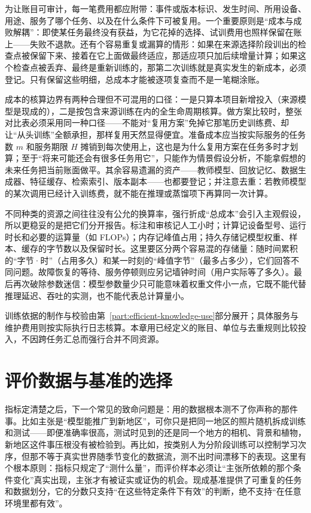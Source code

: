 为让账目可审计，每一笔费用都应附带：事件或版本标识、发生时间、所用设备、用途、服务了哪个任务、以及在什么条件下可被复用。一个重要原则是“成本与成败解耦”：即使某任务最终没有获益，为它花掉的选择、试训费用也照样保留在账上——失败不退款。还有个容易重复或漏算的情形：如果在来源选择阶段训出的检查点被保留下来、接着在它上面做最终适应，那适应项只加后续增量计算；如果这个检查点被丢弃、最终是重新训练的，那第二次训练就是真实发生的新成本，必须登记。只有保留这些明细，总成本才能被逐项复查而不是一笔糊涂账。

成本的核算边界有两种合理但不可混用的口径：一是只算本项目新增投入（来源模型是现成的），二是按包含来源训练在内的全生命周期核算。做方案比较时，整张对比表必须采用同一种口径——不能对“复用方案”免掉它那笔历史训练费、却让“从头训练”全额承担，那样复用天然显得便宜。准备成本应当按实际服务的任务数 $m$ 和服务期限 $H$ 摊销到每次使用上，这也是为什么复用方案在任务多时才划算；至于“将来可能还会有很多任务用它”，只能作为情景假设分析，不能拿假想的未来任务把当前账面做平。其余容易遗漏的资产——教师模型、回放记忆、数据生成器、特征缓存、检索索引、版本副本——也都要登记；并注意去重：若教师模型的某次调用已经计入训练费，就不能在推理或蒸馏项下再算同一次计算。

不同种类的资源之间往往没有公允的换算率，强行折成“总成本”会引入主观假设，所以更稳妥的是把它们分开报告。标注和审核记人工小时；计算记设备型号、运行时长和必要的运算量（如 FLOPs）；内存记峰值占用；持久存储记模型权重、样本、缓存的字节数以及保留时长。这里要区分两个容易混的存储量：随时间累积的“字节·时”（占用多久）和某一时刻的“峰值字节”（最多占多少），它们回答不同问题。故障恢复的等待、服务停顿则应另记墙钟时间（用户实际等了多久）。最后再次破除参数迷信：模型参数量少只可能意味着权重文件小一点，它既不能代替推理延迟、吞吐的实测，也不能代表总计算量小。

训练依据的制作与校验由第~\ref{part:efficient-knowledge-use}部分展开；具体服务与维护费用则按实际执行日志核算。本章用已经定义的账目、单位与去重规则比较投入，不因跨任务汇总而强行合并不同资源。

\section{评价数据与基准的选择}
\label{sec:ket-evaluation-data}

指标定清楚之后，下一个常见的致命问题是：用的数据根本测不了你声称的那件事。比如主张是“模型能推广到新地区”，可你只是把同一地区的照片随机拆成训练和测试——即便准确率很高，测试时见到的还是同一个地方的相机、背景和植物，新地区这件事压根没有被检验到。再比如，按类别人为分阶段训练可以控制学习次序，但那不等于真实世界随季节变化的数据流，测不出时间漂移下的表现。这里有个根本原则：指标只规定了“测什么量”，而评价样本必须让“主张所依赖的那个条件变化”真实出现，主张才有被证实或证伪的机会。现成基准提供了可重复的任务和数据划分，它的分数只支持“在这些特定条件下有效”的判断，绝不支持“在任意环境里都有效”。

